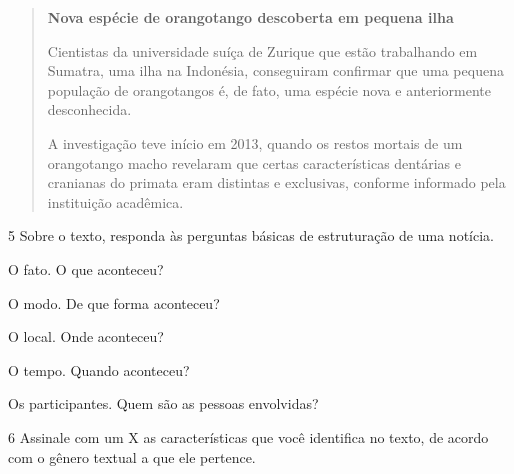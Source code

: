\begin{quote}
\textbf{Nova espécie de orangotango descoberta em pequena ilha}

Cientistas da universidade suíça de Zurique que estão trabalhando em
Sumatra, uma ilha na Indonésia, conseguiram confirmar que uma pequena
população de orangotangos é, de fato, uma espécie nova e anteriormente
desconhecida.

A investigação teve início em 2013, quando os restos mortais de um
orangotango macho revelaram que certas características dentárias e
cranianas do primata eram distintas e exclusivas, conforme informado
pela instituição acadêmica.

\end{quote}

\num{5} Sobre o texto, responda às perguntas básicas de estruturação de
uma notícia.

\begin{escolha}
\item O fato. O que aconteceu? 


\item O modo. De que forma aconteceu? 


\item O local. Onde aconteceu? 


\item O tempo. Quando aconteceu? 


\item Os participantes. Quem são as pessoas envolvidas? 

\end{escolha}

\num{6} Assinale com um X as características que você identifica no
texto, de acordo com o gênero textual a que ele pertence.

